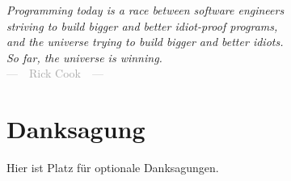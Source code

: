 
\begin{flushright}{\slshape
    Programming today is a race between software engineers \\
    striving to build bigger and better idiot-proof programs, \\
    and the universe trying to build bigger and better idiots. \\
    So far, the universe is winning. } \\ \medskip
    \textcolor{darkgray}{---~~Rick Cook~~---}
\end{flushright}



\bigskip

\begingroup
\let\clearpage\relax
\let\cleardoublepage\relax
\let\cleardoublepage\relax
\chapter*{Danksagung}
Hier ist Platz für optionale Danksagungen.


\endgroup
